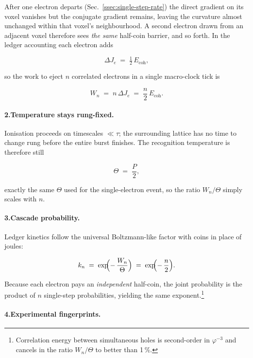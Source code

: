 \documentclass[11pt,oneside]{book}
\begin{document}
After one electron departs (Sec.~\ref{ssec:single-step-rate}) the direct gradient on its voxel vanishes but the conjugate gradient remains, leaving the curvature almost unchanged within that voxel’s neighbourhood.  
A second electron drawn from an adjacent voxel therefore sees \emph{the same} half-coin barrier, and so forth.  
In the ledger accounting each electron adds

\[
  \Delta J_{e} \;=\; \tfrac12\,E_{\text{coh}},
\]

so the work to eject \(n\) correlated electrons in a single macro-clock tick is

\[
  W_{n} \;=\; n\,\Delta J_{e}
           \;=\; \frac{n}{2}\,E_{\text{coh}}.
\]

\paragraph*{2.\;Temperature stays rung-fixed.}

Ionisation proceeds on timescales \(\ll\tau\); the surrounding lattice has no time to change rung before the entire burst finishes.  
The recognition temperature is therefore still

\[
  \Theta \;=\; \frac{P}{2},
\]

exactly the same \(\Theta\) used for the single-electron event, so the ratio \(W_{n}/\Theta\) simply scales with \(n\).

\paragraph*{3.\;Cascade probability.}

Ledger kinetics follow the universal Boltzmann-like factor with coins in place of joules:

\[
  k_{n}
  \;=\;
  \exp\!\!\Bigl(-\,\frac{W_{n}}{\Theta}\Bigr)
  \;=\;
  \exp\!\!\Bigl(-\,\frac{n}{2}\Bigr).
\]

Because each electron pays an \emph{independent} half-coin, the joint probability is the product of \(n\) single-step probabilities, yielding the same exponent.\footnote{Correlation energy between simultaneous holes is second-order in \(\varphi^{-3}\) and cancels in the ratio \(W_{n}/\Theta\) to better than 1 \%.}

\paragraph*{4.\;Experimental fingerprints.}
\end{document}
